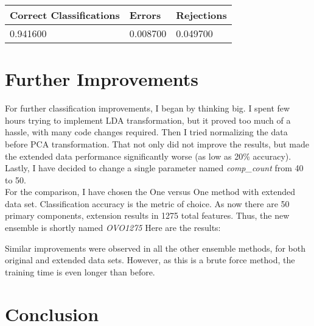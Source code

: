 \documentclass[
  a4paper,            %
  DIV=10,             %
  oneside,            %
  BCOR=5mm,           %
  parskip=half,       %
  numbers=noenddot,   %
  bibtotoc,           %
  listof=totoc,        %
  article
]{scrreprt}
\begin{document}
\begin{center}
  \begin{tabular}{|p{5cm}|p{3cm}|p{3cm}|}
    \hline
    \textbf{Correct Classifications} & \textbf{Errors} & \textbf{Rejections} \\
    \hline
    0.941600 & 0.008700 & 0.049700 \\
    \hline
  \end{tabular}
\end{center}
\section{Further Improvements}
For further classification improvements, I began by thinking big.
I spent few hours trying to implement LDA transformation, but it proved too much of a hassle, with many code changes required.
Then I tried normalizing the data before PCA transformation.
That not only did not improve the results, but made the extended data performance significantly worse (as low as 20\% accuracy).
Lastly, I have decided to change a single parameter named \textit{comp\_count} from 40 to 50.
\\
For the comparison, I have chosen the One versus One method with extended data set.
Classification accuracy is the metric of choice.
As now there are 50 primary components, extension results in 1275 total features.
Thus, the new ensemble is shortly named \textit{OVO1275}
Here are the results:

Similar improvements were observed in all the other ensemble methods, for both original and extended data sets.
However, as this is a brute force method, the training time is even longer than before.
\section{Conclusion}
\end{document}
